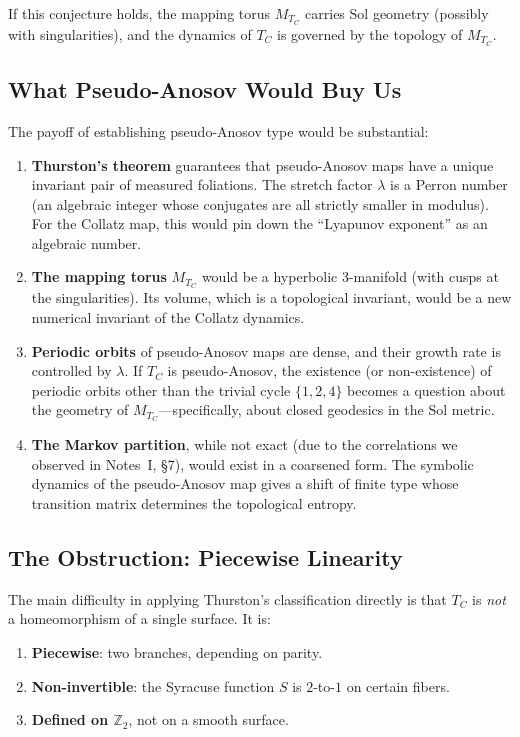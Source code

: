 \documentclass[11pt,a4paper]{article}
\newcommand{\Z}{\mathbb{Z}}
\newcommand{\Sol}{\mathrm{Sol}}
\theoremstyle{plain}
\theoremstyle{definition}
\begin{document}
If this conjecture holds, the mapping torus $M_{T_C}$ carries $\Sol$ geometry (possibly with singularities), and the dynamics of $T_C$ is governed by the topology of $M_{T_C}$.

\subsection{What Pseudo-Anosov Would Buy Us}

The payoff of establishing pseudo-Anosov type would be substantial:

\begin{enumerate}
    \item \textbf{Thurston's theorem} guarantees that pseudo-Anosov maps have a unique invariant pair of measured foliations. The stretch factor $\lambda$ is a Perron number (an algebraic integer whose conjugates are all strictly smaller in modulus). For the Collatz map, this would pin down the ``Lyapunov exponent'' as an algebraic number.

    \item \textbf{The mapping torus} $M_{T_C}$ would be a hyperbolic 3-manifold (with cusps at the singularities). Its volume, which is a topological invariant, would be a new numerical invariant of the Collatz dynamics.

    \item \textbf{Periodic orbits} of pseudo-Anosov maps are dense, and their growth rate is controlled by $\lambda$. If $T_C$ is pseudo-Anosov, the existence (or non-existence) of periodic orbits other than the trivial cycle $\{1, 2, 4\}$ becomes a question about the geometry of $M_{T_C}$---specifically, about closed geodesics in the $\Sol$ metric.

    \item \textbf{The Markov partition}, while not exact (due to the correlations we observed in Notes~I, \S7), would exist in a coarsened form. The symbolic dynamics of the pseudo-Anosov map gives a shift of finite type whose transition matrix determines the topological entropy.
\end{enumerate}


\subsection{The Obstruction: Piecewise Linearity}

The main difficulty in applying Thurston's classification directly is that $T_C$ is \emph{not} a homeomorphism of a single surface. It is:
\begin{enumerate}[label=(\alph*)]
    \item \textbf{Piecewise}: two branches, depending on parity.
    \item \textbf{Non-invertible}: the Syracuse function $S$ is $2$-to-$1$ on certain fibers.
    \item \textbf{Defined on $\Z_2$}, not on a smooth surface.
\end{enumerate}
\end{document}
